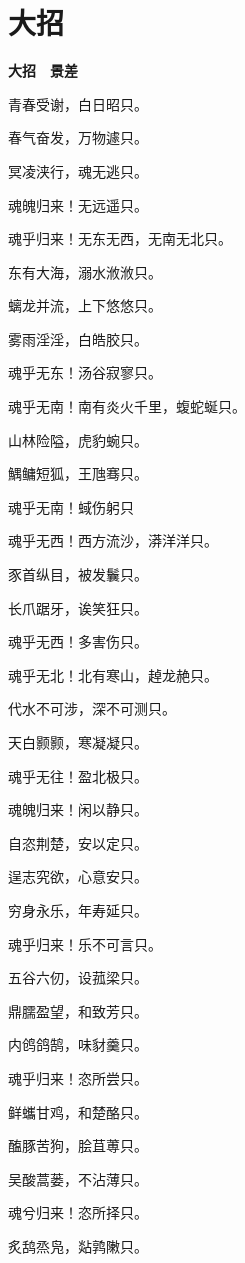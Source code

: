\documentclass[12pt,a4paper]{ctexbook}
\begin{document}
\section{大招}
\textbf{大招　景差}\par\vspace{0.5em}
青春受谢，白日昭只。\par
春气奋发，万物遽只。\par
冥凌浃行，魂无逃只。\par
魂魄归来！无远遥只。\par
魂乎归来！无东无西，无南无北只。\par
东有大海，溺水浟浟只。\par
螭龙并流，上下悠悠只。\par
雾雨淫淫，白皓胶只。\par
魂乎无东！汤谷寂寥只。\par
魂乎无南！南有炎火千里，蝮蛇蜒只。\par
山林险隘，虎豹蜿只。\par
鰅鳙短狐，王虺骞只。\par
魂乎无南！蜮伤躬只\par
魂乎无西！西方流沙，漭洋洋只。\par
豕首纵目，被发鬤只。\par
长爪踞牙，诶笑狂只。\par
魂乎无西！多害伤只。\par
魂乎无北！北有寒山，趠龙赩只。\par
代水不可涉，深不可测只。\par
天白颢颢，寒凝凝只。\par
魂乎无往！盈北极只。\par
魂魄归来！闲以静只。\par
自恣荆楚，安以定只。\par
逞志究欲，心意安只。\par
穷身永乐，年寿延只。\par
魂乎归来！乐不可言只。\par
五谷六仞，设菰梁只。\par
鼎臑盈望，和致芳只。\par
内鸧鸽鹄，味豺羹只。\par
魂乎归来！恣所尝只。\par
鲜蠵甘鸡，和楚酪只。\par
醢豚苦狗，脍苴蒪只。\par
吴酸蒿蒌，不沾薄只。\par
魂兮归来！恣所择只。\par
炙鸹烝凫，煔鹑敶只。\par
\end{document}
